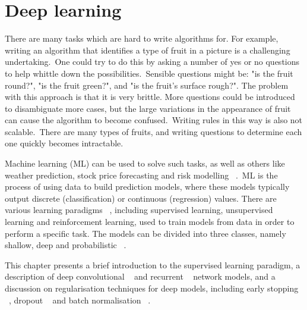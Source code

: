 
\chapter{Deep learning}

\ifpdf
     \graphicspath{{Figs/Chapter2/}}
\else
    \graphicspath{{Chapter2/Figs/Vector/}{Chapter2/Figs/}}
\fi


There are many tasks which are hard to write algorithms for. For example, writing an algorithm that identifies a type of fruit in a picture is a challenging undertaking.\ One could try to do this by asking a number of yes or no questions to help whittle down the possibilities.\ Sensible questions might be: "is the fruit round?", "is the fruit green?", and "is the fruit's surface rough?". The problem with this approach is that it is very brittle. More questions could be introduced to disambiguate more cases, but the large variations in the appearance of fruit can cause the algorithm to become confused.\ Writing rules in this way is also not scalable.\ There are many types of fruits, and writing questions to determine each one quickly becomes intractable. \par
 
\noindent Machine learning (ML) can be used to solve such tasks, as well as others like weather prediction, stock price forecasting and risk modelling \unskip ~\citep{hastie2009elements}.\ ML is the process of using data to build prediction models, where these models typically output discrete (classification) or continuous (regression) values. There are various learning paradigms \unskip ~\citep{murphy2012machine}, including supervised learning, unsupervised learning and reinforcement learning, used to train models from data in order to perform a specific task. The models can be divided into three classes, namely shallow, deep and probabilistic ~\citep{hastie2009elements, murphy2012machine}. \par

\noindent This chapter presents a brief introduction to the supervised learning paradigm, a description of deep convolutional \unskip ~\citep{lecun1998gradient} and recurrent \unskip ~\citep{werbos1988generalization} network models, and a discussion on regularisation techniques for deep models, including early stopping \unskip~\citep{prechelt1998early}, dropout \unskip ~\citep{srivastava2014dropout} and batch normalisation \unskip ~\citep{ioffe2015batch}. 


